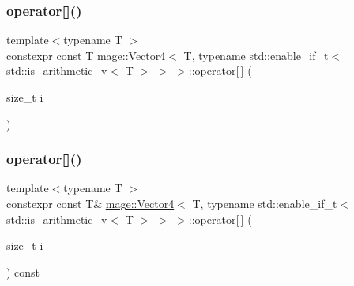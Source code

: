 \subsubsection{\texorpdfstring{operator[]()}{operator[]()}\hspace{0.1cm}{\footnotesize\ttfamily [1/2]}}
{\footnotesize\ttfamily template$<$typename T $>$ \\
constexpr const T \hyperlink{structmage_1_1_vector4}{mage\+::\+Vector4}$<$ T, typename std\+::enable\+\_\+if\+\_\+t$<$ std\+::is\+\_\+arithmetic\+\_\+v$<$ T $>$ $>$ $>$\+::operator\mbox{[}$\,$\mbox{]} (\begin{DoxyParamCaption}\item[{size\+\_\+t}]{i }\end{DoxyParamCaption})\hspace{0.3cm}{\ttfamily [noexcept]}}

\hypertarget{structmage_1_1_vector4_3_01_t_00_01typename_01std_1_1enable__if__t_3_01std_1_1is__arithmetic__v_3_01_t_01_4_01_4_01_4_a520748b98311f5bed3c70a03541559b1}{}\label{structmage_1_1_vector4_3_01_t_00_01typename_01std_1_1enable__if__t_3_01std_1_1is__arithmetic__v_3_01_t_01_4_01_4_01_4_a520748b98311f5bed3c70a03541559b1} 
\subsubsection{\texorpdfstring{operator[]()}{operator[]()}\hspace{0.1cm}{\footnotesize\ttfamily [2/2]}}
{\footnotesize\ttfamily template$<$typename T $>$ \\
constexpr const T\& \hyperlink{structmage_1_1_vector4}{mage\+::\+Vector4}$<$ T, typename std\+::enable\+\_\+if\+\_\+t$<$ std\+::is\+\_\+arithmetic\+\_\+v$<$ T $>$ $>$ $>$\+::operator\mbox{[}$\,$\mbox{]} (\begin{DoxyParamCaption}\item[{size\+\_\+t}]{i }\end{DoxyParamCaption}) const\hspace{0.3cm}{\ttfamily [noexcept]}}



